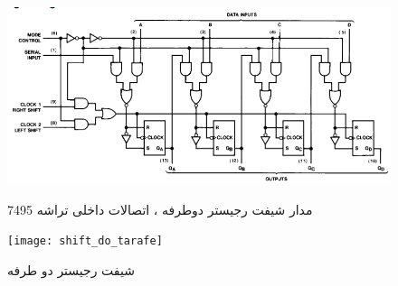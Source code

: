 \documentclass[twoside]{article}
\begin{document}
	\begin{figure}[h!]
		\begin{center}
			\includegraphics[scale=0.60]{7495_logic_diagram}‎
			\caption{مدار شیفت رجیستر دوطرفه ، اتصالات داخلی تراشه 7495}
		\end{center}
	\end{figure} 

	\begin{figure}[h!]
		\begin{center}
			\texttt{[image: shift\_do\_tarafe]}‎
			\caption{شیفت رجیستر دو طرفه}
		\end{center}
	\end{figure} 
	
\end{document}
